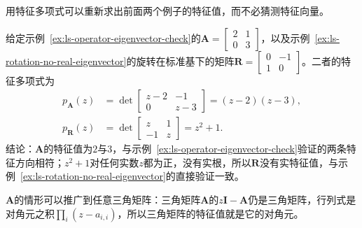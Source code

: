 用特征多项式可以重新求出前面两个例子的特征值，而不必猜测特征向量。
\begin{example}[用特征多项式求特征值]
\label{ex:ls-characteristic-polynomial-two-by-two}
给定示例~\ref{ex:ls-operator-eigenvector-check}的$\bm A=\left[\begin{smallmatrix}2&1\\0&3\end{smallmatrix}\right]$，以及示例~\ref{ex:ls-rotation-no-real-eigenvector}的旋转在标准基下的矩阵$\bm R=\left[\begin{smallmatrix}0&-1\\1&0\end{smallmatrix}\right]$。二者的特征多项式为
\[
 \begin{aligned}
 p_{\bm A}(z)&=\det\begin{bmatrix}z-2&-1\\0&z-3\end{bmatrix}=(z-2)(z-3),\\
 p_{\bm R}(z)&=\det\begin{bmatrix}z&1\\-1&z\end{bmatrix}=z^2+1 .
 \end{aligned}
\]
结论：$\bm A$的特征值为$2$与$3$，与示例~\ref{ex:ls-operator-eigenvector-check}验证的两条特征方向相符；$z^2+1$对任何实数$z$都为正，没有实根，所以$\bm R$没有实特征值，与示例~\ref{ex:ls-rotation-no-real-eigenvector}的直接验证一致。
\end{example}
$\bm A$的情形可以推广到任意三角矩阵：三角矩阵$\bm A$的$z\bm I-\bm A$仍是三角矩阵，行列式是对角元之积$\prod_i(z-a_{i,i})$，所以三角矩阵的特征值就是它的对角元。

